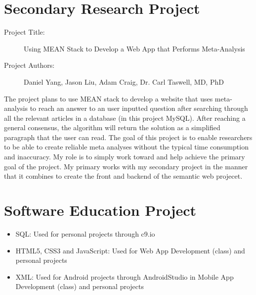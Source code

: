 \documentclass[12pt]{article}
\begin{document}
\section{Secondary Research Project}

\begin{description}
\item[Project Title:]{Using MEAN Stack to Develop a Web App that Performs Meta-Analysis}
\item[Project Authors:] Daniel Yang, Jason Liu, Adam Craig, Dr. Carl Taswell, MD, PhD
\end{description}
	The project plans to use MEAN stack to develop a website that uses meta-analysis to reach an answer to an user inputted question after searching through all the relevant articles in a database (in this project MySQL). After reaching a general consensus, the algorithm will return the solution as a simplified paragraph that the user can read. The goal of this project is to enable researchers to be able to create reliable meta analyses without the typical time consumption and inaccuracy. My role is to simply work toward and help achieve the primary goal of the project. My primary works with my secondary project in the manner that it combines to create the front and backend of the semantic web projecet. 

\section{Software Education Project}

\begin{itemize}
\item SQL: Used for personal projects through c9.io
\item HTML5, CSS3 and JavaScript: Used for Web App Development (class) and personal projects
\item XML: Used for Android projects through AndroidStudio in Mobile App Development (class) and personal projects
\end{itemize}
\end{document}
